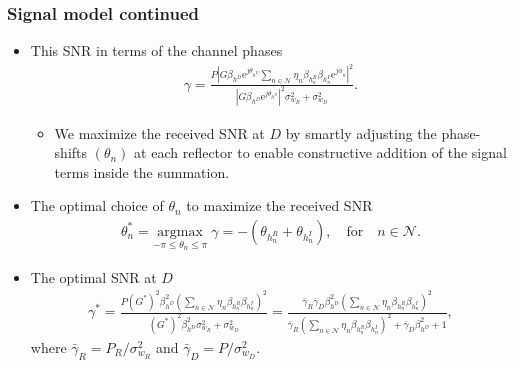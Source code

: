 \documentclass[article,mathserif,10pt,envcountsect]{beamer}
\renewcommand{\exp}[1]{\mathrm{e}^{#1}}
\begin{document}
\begin{frame}
\frametitle{Signal model continued}
\begin{itemize}
	\item This SNR in terms of the channel phases  
	\begin{eqnarray}\label{eqn:snr_phase}
	\gamma =  \frac{P \left| G \beta_{h^D} \exp{j\theta_{h^D}} \sum_{n \in \mathcal{N}} \eta_{n} \beta_{h_{n}^R}  \beta_{h_{n}^I} \exp{j \phi_{n}}  \right|^2}{\left|G \beta_{h^D} \exp{j\theta_{h^D}} \right|^2 \sigma_{w_R}^2 + \sigma_{w_D}^2}. \nonumber
	\end{eqnarray}
	
	\begin{block}{}
		\begin{itemize}
			\item We  maximize the received SNR   at $D$ by smartly adjusting the phase-shifts $\left(\theta_n\right)$ at each reflector to enable  constructive addition of the signal terms inside the summation.
		\end{itemize}
	\end{block}
	
	
	\item The optimal choice of  $\theta_n$ to maximize the received SNR 
	\begin{eqnarray}\label{eqn:opt_theta}
	\theta_{n}^* =\underset{-\pi\leq \theta_{n} \leq \pi}{ \mathrm{argmax}} \;{\gamma} = - \left(\theta_{h_{n}^R} + \theta_{h_{n}^I}\right), \quad \text{for} \quad n \in \mathcal{N}. \nonumber
	\end{eqnarray}  
	
	\item The optimal SNR at $D$ 
		\begin{eqnarray}
		\!\!\!\!\!\!\!\!\!\!\!\!\!\!\!  \gamma^* = \frac{P  \left(G^{*}\right)^2 \beta_{h^D}^2  \left(\sum_{n \in \mathcal{N}} \eta_{n} \beta_{h_{n}^R}  \beta_{h_{n}^I} \right)^2}{ \left(G^{*}\right)^2 \beta_{h^D}^2 \sigma_{w_R}^2 + \sigma_{w_D}^2} = \frac{\bar{\gamma}_R \bar{\gamma}_D   \beta_{h^D}^2  \left(\sum_{n \in \mathcal{N}} \eta_{n} \beta_{h_{n}^R}  \beta_{h_{n}^I} \right)^2}{ \bar{\gamma}_R \left(\sum_{n \in \mathcal{N}} \eta_{n} \beta_{h_{n}^R}  \beta_{h_{n}^I} \right)^2  + \bar{\gamma}_D \beta_{h^D}^2 +1 },\label{eqn:snr_opt} \nonumber
		\end{eqnarray} 
	where $\bar{\gamma}_R \!=\! P_R/\sigma_{w_R}^2$ and $\bar{\gamma}_D \!=\! P/\sigma_{w_D}^2$.
	
\end{itemize}
\end{frame}	
\end{document}
